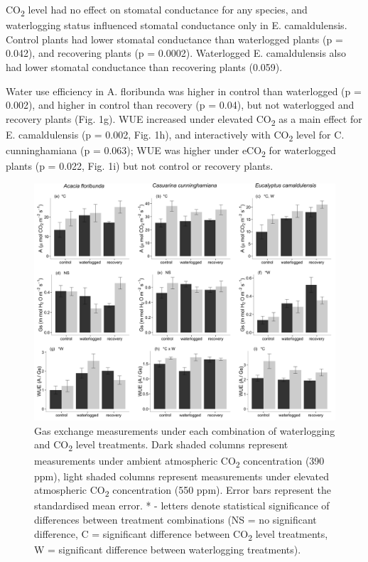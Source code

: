 \documentclass[12pt,a4paper]{memoir}
\begin{document}
CO\textsubscript{2} level had no effect on stomatal conductance for any species, and waterlogging status influenced stomatal conductance only in E. camaldulensis. Control plants had lower stomatal conductance than waterlogged plants (p = 0.042), and recovering plants (p = 0.0002). Waterlogged E. camaldulensis also had lower stomatal conductance than recovering plants (0.059).

Water use efficiency in A. floribunda was higher in control than waterlogged (p = 0.002), and higher in control than recovery (p = 0.04), but not waterlogged and recovery plants (Fig. 1g). WUE increased under elevated CO\textsubscript{2} as a main effect for E. camaldulensis (p = 0.002, Fig. 1h), and interactively with CO\textsubscript{2} level for C. cunninghamiana (p = 0.063); WUE was higher under eCO\textsubscript{2} for waterlogged plants (p = 0.022, Fig. 1i) but not control or recovery plants.

\begin{figure}[ht]
\begin{center}
\includegraphics[width=\linewidth,keepaspectratio=true]{gasexchange2.png} %
\caption[Gas exchange measurements under each combination of waterlogging and CO\textsubscript{2} level treatments.]{\small{Gas exchange measurements under each combination of waterlogging and CO\textsubscript{2} level treatments. Dark shaded columns represent measurements under ambient atmospheric CO\textsubscript{2} concentration (390 ppm), light shaded columns represent measurements under elevated atmospheric CO\textsubscript{2} concentration (550 ppm). Error bars represent the standardised mean error. * - letters denote statistical significance of differences between treatment combinations (NS = no significant difference, C = significant difference between CO\textsubscript{2} level treatments, W = significant difference between waterlogging treatments).}} %
\label{Ch5_F1} %
\end{center}
\end{figure}
\end{document}
